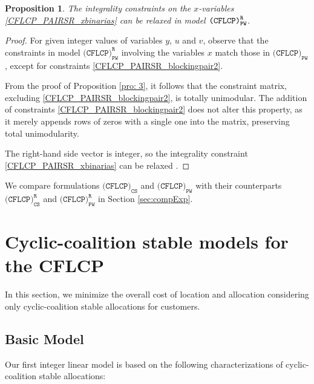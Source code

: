 \documentclass[preprint,11pt,authoryear]{elsarticle}
\newtheorem{prop}[theorem]{Proposition}
\begin{document}
\begin{prop}
    The integrality constraints on the $x$-variables \eqref{CFLCP_PAIRSR_xbinarias} can be relaxed in model ${\normalfont \texttt{(CFLCP)}_{\texttt{PW}}^\texttt{R}}$.
\end{prop}
\begin{proof}
For given integer values of variables $y$, $u$ and $v$, observe that the constraints in model $\texttt{(CFLCP)}_{\texttt{PW}}^\texttt{R}$ involving the variables $x$ match those in $\texttt{(CFLCP)}_{\texttt{PW}}$, except for constraints \eqref{CFLCP_PAIRSR_blockingpair2}. 

From the proof of Proposition \ref{pro: 3}, it follows that the constraint matrix, excluding \eqref{CFLCP_PAIRSR_blockingpair2}, is totally unimodular. The addition of constraints \eqref{CFLCP_PAIRSR_blockingpair2} does not alter this property, as it merely appends rows of zeros with a single one into the matrix, preserving total unimodularity.

The right-hand side vector is integer, so the integrality constraint \eqref{CFLCP_PAIRSR_xbinarias} can be relaxed \cite[Proposition 2.3]{wolsey1999integer}.
\end{proof}

We compare formulations $\texttt{(CFLCP)}_{\texttt{CS}}$ and $\texttt{(CFLCP)}_{\texttt{PW}}$ with their counterparts $\texttt{(CFLCP)}_{\texttt{CS}}^\texttt{R}$ and $\texttt{(CFLCP)}_{\texttt{PW}}^\texttt{R}$ in Section \ref{sec:compExp}.

\section{Cyclic-coalition stable models for the CFLCP} \label{sec:cycliccoalitionstablemodels}
In this section, we minimize the overall cost of location and allocation considering only cyclic-coalition stable allocations for customers.

\subsection{Basic Model}
 Our first integer linear model is based on the following characterizations of cyclic-coalition stable allocations:
\end{document}
